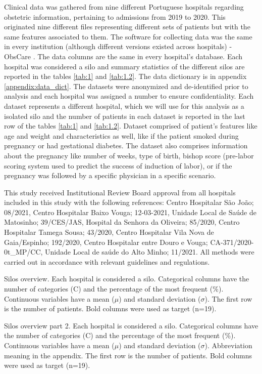Clinical data was gathered from nine different Portuguese hospitals regarding obstetric information, pertaining to admissions from 2019 to 2020. This originated nine different files representing different sets of patients but with the same features associated to them. The software for collecting data was the same in every institution (although different versions existed across hospitals) - ObsCare \cite{obscare}. The data columns are the same in every hospital's database. Each hospital was considered a silo and summary statistics of the different silos are reported in the tables \ref{tab:1} and \ref{tab:1.2}. The data dictionary is in appendix \ref{appendix:data_dict}.
The datasets were anonymized and de-identified prior to analysis and each hospital was assigned a number to ensure confidentiality. Each dataset represents a different hospital, which we will use for this analysis as a isolated silo and the number of patients in each dataset is reported in the last row of the tables \ref{tab:1} and \ref{tab:1.2}. Dataset comprised of patient's features like age and weight and characteristics as well, like if the patient smoked during pregnancy or had gestational diabetes. The dataset also comprises information about the pregnancy like number of weeks, type of birth, bishop score (pre-labor scoring system used to predict the success of induction of labor), or if the pregnancy was followed by a specific physician in a specific scenario.

This study received Institutional Review Board approval from all hospitals included in this study with the following references: Centro Hospitalar São João; 08/2021, Centro Hospitalar Baixo Vouga; 12-03-2021, Unidade Local de Saúde de Matosinho; 39/CES/JAS, Hospital da Senhora da Oliveira; 85/2020, Centro Hospitalar Tamega Sousa; 43/2020, Centro Hospitalar Vila Nova de Gaia/Espinho; 192/2020, Centro Hospitalar entre Douro e Vouga; CA-371/2020-0t\_MP/CC, Unidade Local de saúde do Alto Minho; 11/2021.
All methods were carried out in accordance with relevant guidelines and regulations.

{\small
\begin{table}[htbp]
\caption[Silos overview part 1]{\label{tab:1}Silos overview. Each hospital is considered a silo. Categorical columns have the number of categories (C) and the percentage of the most frequent (\%). Continuous variables have a mean ($\mu$) and standard deviation ($\sigma$).  The first row is the number of patients. Bold columns were used as target (n=19).}

\centering

\end{table}
}
\newpage

{\small
\begin{table}[htbp]
\caption[Silos overview part 2]{\label{tab:1.2}Silos overview part 2. Each hospital is considered a silo. Categorical columns have the number of categories (C) and the percentage of the most frequent (\%). Continuous variables have a mean ($\mu$) and standard deviation ($\sigma$). Abbreviation meaning in the appendix. The first row is the number of patients. Bold columns were used as target (n=19).}
\centering

\end{table}
}


